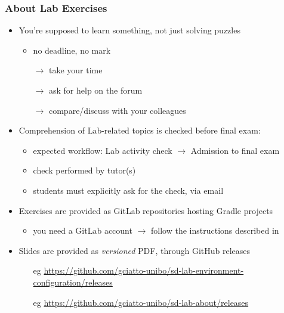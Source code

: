 \documentclass[presentation]{beamer}\mode<presentation>{\usetheme{AMSCesenaPurpleAndGold}}
\begin{document}
\begin{frame}%
	\frametitle{About Lab Exercises}

	\begin{itemize}
		\item You're supposed to learn something, not just solving puzzles
		\begin{itemize}
			\item no deadline, no mark
			\item[$\rightarrow$] take your time
			\item[$\rightarrow$] ask for help on the forum
			\item[$\rightarrow$] compare/discuss with your colleagues
		\end{itemize}

		\vfill

		\item Comprehension of Lab-related topics is checked before final exam:
		\begin{itemize}
			\item \alert{expected workflow:} Lab activity check $\rightarrow$ Admission to final exam
			\item check performed by tutor(s)
			\item students must explicitly ask for the check, via email
		\end{itemize}

		\vfill

		\item Exercises are provided as GitLab repositories hosting Gradle projects
		\begin{itemize}
			\item you need a GitLab account $\rightarrow$ follow the instructions described in 
		\end{itemize}

        \vfill

        \item Slides are provided as \emph{versioned} PDF, through GitHub releases
        \begin{itemize}
            \item[eg] \url{https://github.com/gciatto-unibo/sd-lab-environment-configuration/releases}
            \item[eg] \url{https://github.com/gciatto-unibo/sd-lab-about/releases}
        \end{itemize}

	\end{itemize}

\end{frame}
\end{document}
